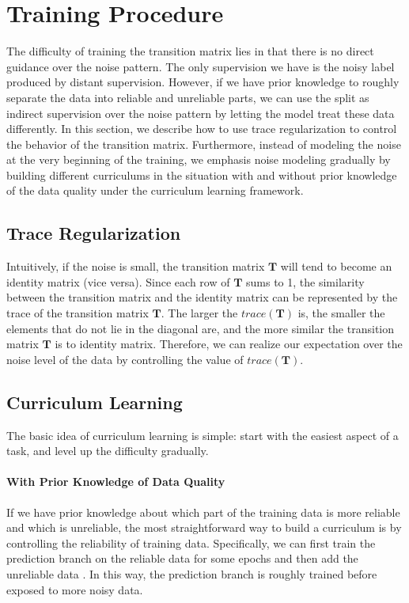 \section{Training Procedure \label{sec:training}}
The difficulty of training the transition matrix lies in that there is no direct guidance over the noise pattern. The only supervision we have is the noisy label produced by distant supervision. However, if we have prior knowledge to roughly separate the data into reliable and unreliable parts, we can use the split as indirect supervision over the noise pattern by letting the model treat these data differently. In this section, we describe how to use trace regularization to control the behavior of the transition matrix. Furthermore, instead of modeling the noise at the very beginning of the training, we emphasis noise modeling gradually by building different curriculums in the situation with and without prior knowledge of the data quality under the curriculum learning framework.

\subsection{Trace Regularization}
Intuitively, if the noise is small, the transition matrix $\mathbf{T}$ will tend to become an identity matrix (vice versa).  Since each row of $\mathbf{T}$ sums to 1, the similarity between the transition matrix and the identity matrix can be represented by the trace of the transition matrix $\mathbf{T}$. The larger the $trace(\mathbf{T})$ is, the smaller the elements that do not lie in the diagonal are, and the more similar the transition matrix $\mathbf{T}$ is to identity matrix. Therefore, we can realize our expectation over the noise level of the data by controlling the value of $trace(\mathbf{T})$.

\subsection{Curriculum Learning}
The basic idea of curriculum learning is simple: start with the easiest aspect of a task, and level up the difficulty gradually.

\paragraph{With Prior Knowledge of Data Quality}
If we have prior knowledge about which part of the training data is more reliable and which is unreliable, the most straightforward way to build a curriculum is by controlling the reliability of training data. Specifically, we can first train the prediction branch on the reliable data for some epochs and then add the unreliable data . In this way, the prediction branch is roughly trained before exposed to more noisy data.

